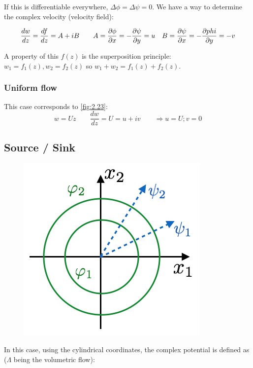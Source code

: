  		If this is differentiable everywhere, $\Delta \phi = \Delta \psi = 0$. We have a way to determine the complex velocity (velocity field):
 		
 		\begin{equation}
 		\frac{dw}{dz} = \frac{df}{dz} = A + iB \qquad A = \frac{\D \phi}{\D x} = - \frac{\D \psi}{\D y} = u \quad B = \frac{\D \psi}{\D x} = - \frac{\D phi}{\D y} = -v
 		\end{equation}
 		
 		A property of this $f(z)$ is the superposition principle: $w_1 = f_1(z), w_2 = f_2(z)$ so $w_1 + w_2 = f_1(z)+f_2(z)$.
 		
 	\subsubsection{Uniform flow}
 		This case corresponds to \autoref{fig:2.23}:
 		\begin{equation}
 		w = U z \qquad \frac{d w}{dz} = U = u+iv \qquad \Rightarrow u = U; v = 0
 		\end{equation}
 		
 	\subsection{Source / Sink}
 		\begin{figure}
		\vspace{-5mm}
		\includegraphics[scale=0.5]{ch2/25}
		\end{figure}
		In this case, using the cylindrical coordinates, the complex potential is defined as ($\Lambda$ being the volumetric flow): 
 		
